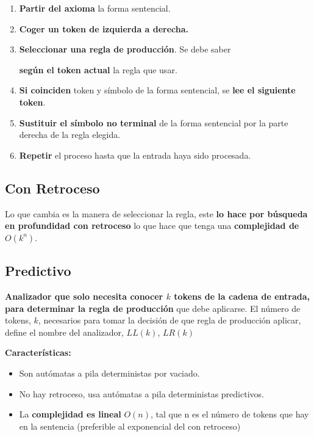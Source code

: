 \documentclass[12pt, twoside, openright]{report} %
\begin{document}
\begin{enumerate}
\def\labelenumi{\arabic{enumi}.}

\item
  \textbf{Partir del axioma} la forma sentencial.
\item
  \textbf{Coger un token de izquierda a derecha.}
\item
  \textbf{Seleccionar una regla de producción}. Se debe saber
  
  \textbf{según el token actual} la regla que usar.
\item
  \textbf{Si coinciden} token y símbolo de la forma sentencial, se
  \textbf{lee el siguiente token}.
\item
  \textbf{Sustituir el símbolo no terminal} de la forma sentencial por
  la parte derecha de la regla elegida.
\item
  \textbf{Repetir} el proceso hasta que la entrada haya sido procesada.
\end{enumerate}


\subsection{Con Retroceso}

Lo que cambia es la manera de seleccionar la regla, este \textbf{lo hace
por búsqueda en profundidad con retroceso} lo que hace que tenga una
\textbf{complejidad de \(O(k^n)\)}.


\subsection{Predictivo}

\textbf{Analizador que solo necesita conocer \(k\) tokens de la cadena
de entrada, para determinar la regla de producción} que debe aplicarse.
El número de tokens, \(k\), necesarios para tomar la decisión de que
regla de producción aplicar, define el nombre del analizador, \(LL(k)\),
\(LR(k)\)

\textbf{Características:}

\begin{itemize}

\item
  Son autómatas a pila deterministas por vaciado.
\item
  No hay retroceso, usa autómatas a pila deterministas predictivos.
\item
  La \textbf{complejidad es lineal} \(O(n)\), tal que n es el número de
  tokens que hay en la sentencia (preferible al exponencial del con
  retroceso)
\end{itemize}
\end{document}
